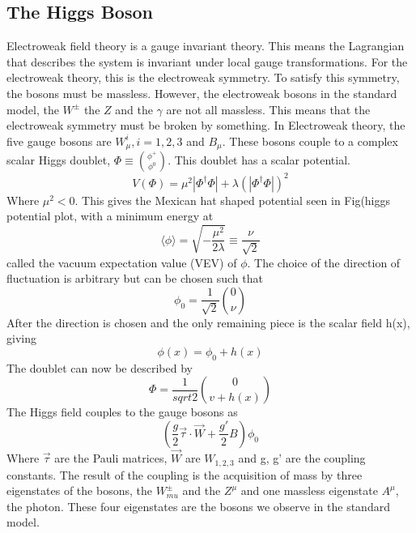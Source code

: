 \subsection{The Higgs Boson}
Electroweak field theory is a gauge invariant theory. This means the Lagrangian that describes the system is invariant under local gauge transformations. For the electroweak theory, this is the electroweak symmetry. To satisfy this symmetry, the bosons must be massless. However, the electroweak bosons in the standard model, the ${W^{\pm}}$ the ${Z}$ and the ${\gamma}$ are not all massless. This means that the electroweak symmetry must be broken by something.\linebreak
\indent In Electroweak theory, the five gauge bosons are ${W^{i}_{\mu}, i = 1,2,3}$ and ${B_{\mu}}$. These bosons couple to a complex scalar Higgs doublet, ${\Phi \equiv \binom{\phi^{+}}{\phi^{0}}}$. This doublet has a scalar potential.
\begin{equation}
V(\Phi) = \mu^{2}|\Phi^{\dagger}\Phi| + \lambda(|\Phi^{\dagger}\Phi|)^{2}
\end{equation}
Where ${\mu^{2} < 0}$. This gives the Mexican hat shaped potential seen in Fig(higgs potential plot, with a minimum energy at 
\begin{equation}
\langle \phi \rangle = \sqrt{-\frac{\mu^{2}}{2\lambda}}\equiv \frac{\nu}{\sqrt{2}}
\end{equation}
called the vacuum expectation value (VEV) of ${\phi}$. The choice of the direction of fluctuation is arbitrary but can be chosen such that 
\begin{equation}
\phi_{0} = \frac{1}{\sqrt{2}} \binom{0}{\nu}
\end{equation}
After the direction is chosen and the only remaining piece is the scalar field h(x), giving 
\begin{equation}
\phi(x) = \phi_{0} + h(x)
\end{equation}
The doublet can now be described by 
\begin{equation}
\Phi = \frac{1}{sqrt{2}} \binom{0}{v+h(x)}
\end{equation}
The Higgs field couples to the gauge bosons as 
\begin{equation}
(\frac{g}{2}\overrightarrow{\tau}\cdot \overrightarrow{W} + \frac{g'}{2}B)\phi_{0}
\end{equation}
Where ${\overrightarrow{\tau}}$ are the Pauli matrices, ${\overrightarrow{W}}$ are ${W_{1,2,3}}$ and g, g' are the coupling constants. The result of the coupling is the acquisition of mass by three eigenstates of the bosons, the ${W^{\pm}_{mu}}$ and the ${Z^{\mu}}$ and one massless eigenstate ${A^{\mu}}$, the photon. These four eigenstates are the bosons we observe in the standard model. 